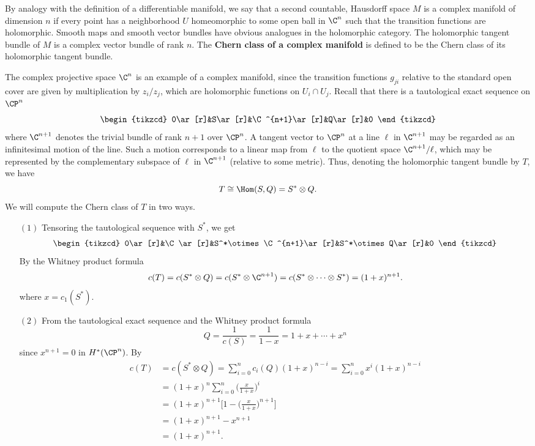 \begin{example}\label{Chern class CP^n}
By analogy with the definition of a differentiable manifold, we say that a second countable, Hausdorff space $M$ is a complex manifold of dimension $n$ if every point 
has a neighborhood $U$ homeomorphic to some open ball in $\C^n$ such that the transition functions are holomorphic. Smooth maps and smooth vector bundles have obvious
analogues in the holomorphic category. The holomorphic tangent bundle of $M$ is a complex vector bundle of rank $n$. The \textbf{Chern class of a complex manifold} is defined 
to be the Chern class of its holomorphic tangent bundle.\par
The complex projective space $\C^n$ is an example of a complex manifold, since the transition functions $g_{ji}$ relative to the standard open cover are given by 
multiplication by $z_i/z_j$, which are holomorphic functions on $U_i\cap U_j$. Recall that there is a tautological exact sequence on $\CP^n$
\[\begin{tikzcd}
0\ar[r]&S\ar[r]&\C^{n+1}\ar[r]&Q\ar[r]&0
\end{tikzcd}\]
where $\C^{n+1}$ denotes the trivial bundle of rank $n+1$ over $\CP^n$. A tangent vector to $\CP^n$ at a line $\ell$ in $\C^{n+1}$ may be regarded as an infinitesimal 
motion of the line. Such a motion corresponds to a linear map from $\ell$ to the quotient space $\C^{n+1}/\ell$, which may be represented by the complementary subspace 
of $\ell$ in $\C^{n+1}$ (relative to some metric). Thus, denoting the holomorphic tangent bundle by $T$, we have
\[T\cong \Hom(S,Q)=S^*\otimes Q.\]
We will compute the Chern class of $T$ in two ways.
\begin{itemize}
\item[$(1)$] Tensoring the tautological sequence with $S^*$, we get
\[\begin{tikzcd}
0\ar[r]&\C\ar[r]&S^*\otimes\C^{n+1}\ar[r]&S^*\otimes Q\ar[r]&0
\end{tikzcd}\]
By the Whitney product formula
\[c(T)=c(S^*\otimes Q)=c(S^*\otimes\C^{n+1})=c(S^*\otimes\cdots\otimes S^*)=(1+x)^{n+1}.\]
where $x=c_1(S^*)$.
\item[$(2)$] From the tautological exact sequence and the Whitney product formula
\[Q=\frac{1}{c(S)}=\frac{1}{1-x}=1+x+\cdots+x^n\]
since $x^{n+1}=0$ in $H^*(\CP^n)$. By 
\begin{align*}
c(T)&=c(S^*\otimes Q)=\sum_{i=0}^{n}c_i(Q)(1+x)^{n-i}=\sum_{i=0}^{n}x^i(1+x)^{n-i}\\
&=(1+x)^n\sum_{i=0}^{n}\Big(\frac{x}{1+x})^{i}\\
&=(1+x)^{n+1}\Big[1-\Big(\frac{x}{1+x}\Big)^{n+1}\Big]\\
&=(1+x)^{n+1}-x^{n+1}\\
&=(1+x)^{n+1}.
\end{align*}
\end{itemize}
\end{example}

